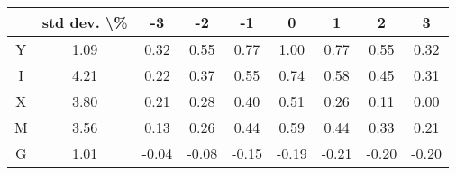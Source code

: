 \begin{tabular}{ccccccccc}
\toprule
{} & std dev. \textbackslash \% &     -3 &     -2 &     -1 &      0 &      1 &      2 &      3 \\
\midrule
Y &        1.09 &   0.32 &   0.55 &   0.77 &   1.00 &   0.77 &   0.55 &   0.32 \\
I &        4.21 &   0.22 &   0.37 &   0.55 &   0.74 &   0.58 &   0.45 &   0.31 \\
X &        3.80 &   0.21 &   0.28 &   0.40 &   0.51 &   0.26 &   0.11 &   0.00 \\
M &        3.56 &   0.13 &   0.26 &   0.44 &   0.59 &   0.44 &   0.33 &   0.21 \\
G &        1.01 &  -0.04 &  -0.08 &  -0.15 &  -0.19 &  -0.21 &  -0.20 &  -0.20 \\
\bottomrule
\end{tabular}
